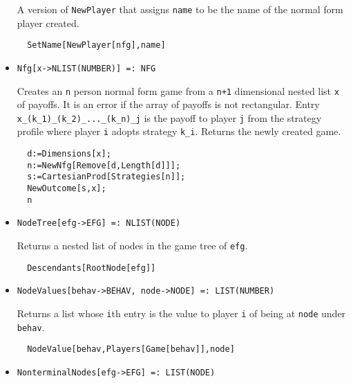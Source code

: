 \begin{itemize}
\bd 
A version of \verb+NewPlayer+ that assigns \verb+name+ to be the name
of the normal form player created.  
\begin{verbatim}
  SetName[NewPlayer[nfg],name]
\end{verbatim} 
\ed

\item{}
\protect \large \begin{verbatim}
Nfg[x->NLIST(NUMBER)] =: NFG 
\end{verbatim}\normalsize

\bd 

Creates an \verb+n+ person normal form game from a \verb&n+1&
dimensional nested list \verb+x+ of payoffs.  It is an error if the
array of payoffs is not rectangular.  Entry
\verb+x_(k_1)_(k_2)_..._(k_n)_j+ is the payoff to player \verb+j+ from
the strategy profile where player \verb+i+ adopts strategy \verb+k_i+.
Returns the newly created game.

\begin{verbatim}
  d:=Dimensions[x];
  n:=NewNfg[Remove[d,Length[d]]];
  s:=CartesianProd[Strategies[n]];
  NewOutcome[s,x];
  n
\end{verbatim} 
\ed

\item{}
\protect \large \begin{verbatim}
NodeTree[efg->EFG] =: NLIST(NODE) 
\end{verbatim}\normalsize

\bd 
Returns a nested list of nodes in the game tree of \verb+efg+.  
\begin{verbatim}
  Descendants[RootNode[efg]]
\end{verbatim} 
\ed

\item{}
\protect \large \begin{verbatim}
NodeValues[behav->BEHAV, node->NODE] =: LIST(NUMBER) 
\end{verbatim}\normalsize

\bd 
Returns a list whose \verb+i+th entry is the value to player \verb+i+
of being at \verb+node+ under \verb+behav+.
\begin{verbatim}
  NodeValue[behav,Players[Game[behav]],node]
\end{verbatim} 
\ed

\item{}
\protect \large \begin{verbatim}
NonterminalNodes[efg->EFG] =: LIST(NODE) 
\end{verbatim}\normalsize


\end{itemize}
